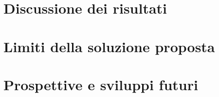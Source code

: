 \documentclass[12pt]{report}
\begin{document}
\section{Discussione dei risultati}
\label{sec:discussione_risultati}

\section{Limiti della soluzione proposta}
\label{sec:limiti}

\section{Prospettive e sviluppi futuri}
\label{sec:prospettive}

\beforebibliography



\closingpage
\end{document}
